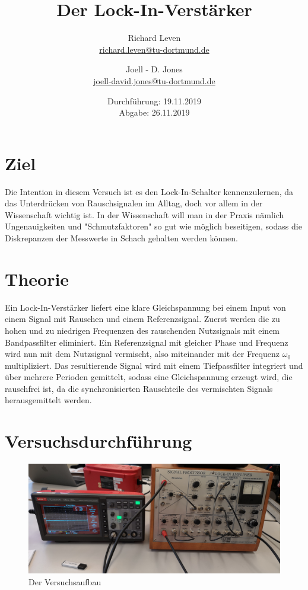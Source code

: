 \documentclass[captions=tableheading]{scrartcl}
\title{Der Lock-In-Verstärker}
\author{Richard Leven \\ \href{mailto:richard.leven@tu-dortmund.de}{richard.leven@tu-dortmund.de}
 \and Joell - D. Jones \\ \href{mailto:joell-david.jones@tu-dortmund.de}{joell-david.jones@tu-dortmund.de}}
\date{
    Durchführung: 19.11.2019\\
    Abgabe: 26.11.2019
}
\begin{document}
\maketitle
\newpage
\thispagestyle{empty}
\tableofcontents
\newpage
\section{Ziel}
Die Intention in diesem Versuch ist es den Lock-In-Schalter kennenzulernen, da das Unterdrücken von Rauschsignalen im Alltag, doch vor allem in der Wissenschaft wichtig ist. In der Wissenschaft will man in der Praxis nämlich Ungenauigkeiten und "Schmutzfaktoren" so gut wie möglich beseitigen, sodass die Diskrepanzen der Messwerte in Schach gehalten werden können. 
\section{Theorie}
Ein Lock-In-Verstärker liefert eine klare Gleichspannung bei einem Input von einem Signal mit Rauschen und einem Referenzsignal.
Zuerst werden die zu hohen und zu niedrigen Frequenzen des rauschenden Nutzsignals mit einem Bandpassfilter eliminiert.
Ein Referenzsignal mit gleicher Phase und Frequenz wird nun mit dem Nutzsignal vermischt, also miteinander mit der Frequenz \(\omega_0\) multipliziert. Das resultierende Signal wird mit einem Tiefpassfilter integriert und über mehrere Perioden gemittelt, sodass eine Gleichspannung erzeugt wird, die rauschfrei ist, da die synchronisierten Rauschteile des vermischten Signals herausgemittelt werden.
\section{Versuchsdurchführung}
\begin{figure}
\centering
\includegraphics[scale=0.07]{Lock_In Bilder/Versauf.jpg}
\caption{Der Versuchsaufbau}
\label{fig:versau}
\end{figure}
\end{document}
